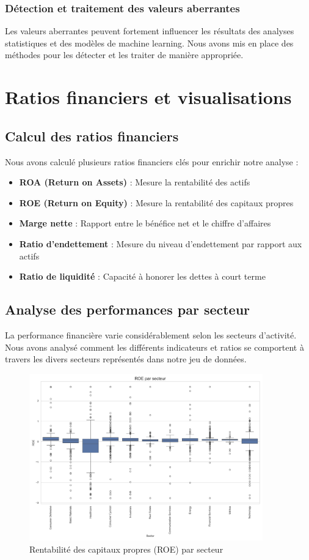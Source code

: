 \documentclass[11pt]{report}
\begin{document}
\subsection{Détection et traitement des valeurs aberrantes}
Les valeurs aberrantes peuvent fortement influencer les résultats des analyses statistiques et des modèles de machine learning. Nous avons mis en place des méthodes pour les détecter et les traiter de manière appropriée.

\chapter{Ratios financiers et visualisations}
\section{Calcul des ratios financiers}
Nous avons calculé plusieurs ratios financiers clés pour enrichir notre analyse :
\begin{itemize}
    \item \textbf{ROA (Return on Assets)} : Mesure la rentabilité des actifs
    \item \textbf{ROE (Return on Equity)} : Mesure la rentabilité des capitaux propres
    \item \textbf{Marge nette} : Rapport entre le bénéfice net et le chiffre d'affaires
    \item \textbf{Ratio d'endettement} : Mesure du niveau d'endettement par rapport aux actifs
    \item \textbf{Ratio de liquidité} : Capacité à honorer les dettes à court terme
\end{itemize}

\section{Analyse des performances par secteur}
La performance financière varie considérablement selon les secteurs d'activité. Nous avons analysé comment les différents indicateurs et ratios se comportent à travers les divers secteurs représentés dans notre jeu de données.

\begin{figure}[H]
    \centering
    \includegraphics[width=0.9\textwidth]{figures/ROE_by_sector.png}
    \caption{Rentabilité des capitaux propres (ROE) par secteur}
    \label{fig:roe_by_sector}
\end{figure}
\end{document}
